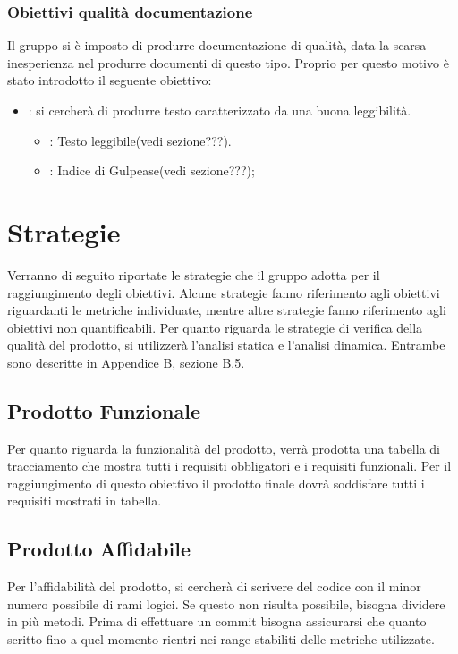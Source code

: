 \subsubsection{Obiettivi qualità documentazione}
Il gruppo \NomeGruppo{} si è imposto di produrre documentazione di qualità, data la scarsa inesperienza nel produrre documenti di questo tipo. Proprio per questo motivo è stato introdotto il seguente obiettivo:
\begin{itemize}
\item {}: si cercherà di produrre testo caratterizzato da una buona leggibilità.
\begin{itemize}
\item {}: Testo leggibile(vedi sezione???).
\item {}: Indice di Gulpease(vedi sezione???);
\end{itemize}
\end{itemize} 

\newpage

\section{Strategie}
Verranno di seguito riportate le strategie che il gruppo adotta per il raggiungimento degli obiettivi. Alcune strategie fanno riferimento agli obiettivi riguardanti le metriche individuate, mentre altre strategie fanno riferimento agli obiettivi non quantificabili.
Per quanto riguarda le strategie di verifica della qualità del prodotto, si utilizzerà l'analisi statica e l'analisi dinamica. Entrambe sono descritte in Appendice B, sezione B.5.

\subsection{Prodotto Funzionale}
Per quanto riguarda la funzionalità del prodotto, verrà prodotta una tabella di tracciamento che mostra tutti i requisiti obbligatori e i requisiti funzionali. Per il raggiungimento di questo obiettivo il prodotto finale dovrà soddisfare tutti i requisiti mostrati in tabella.

\subsection{Prodotto Affidabile}
Per l'affidabilità del prodotto, si cercherà di scrivere del codice con il minor numero possibile di rami logici. Se questo non risulta possibile, bisogna dividere in più metodi. Prima di effettuare un commit bisogna assicurarsi che quanto scritto fino a quel momento rientri nei range stabiliti delle metriche utilizzate.

